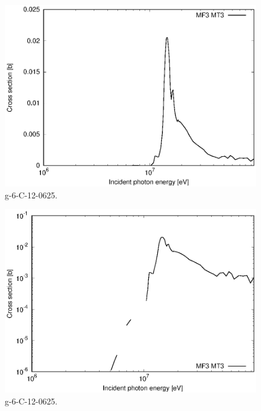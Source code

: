 \begin{figure}
 \includegraphics[width=\linewidth]{eps/g_6-C-12_0625.eps}
  \caption{g-6-C-12-0625.}
\end{figure}
\begin{figure}
 \includegraphics[width=\linewidth]{eps-log/g_6-C-12_0625.eps}
 \caption{g-6-C-12-0625.}
\end{figure}
\newpage \clearpage


